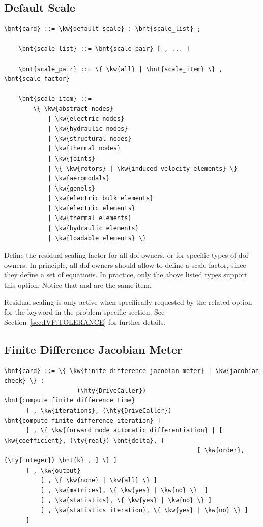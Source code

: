 \subsection{Default Scale}\label{sec:CONTROLDATA:DEFAULTSCALE}
\begin{Verbatim}[commandchars=\\\{\}]
    \bnt{card} ::= \kw{default scale} : \bnt{scale_list} ;

    \bnt{scale_list} ::= \bnt{scale_pair} [ , ... ]

    \bnt{scale_pair} ::= \{ \kw{all} | \bnt{scale_item} \} , \bnt{scale_factor}

    \bnt{scale_item} ::=
        \{ \kw{abstract nodes}
            | \kw{electric nodes}
            | \kw{hydraulic nodes}
            | \kw{structural nodes}
            | \kw{thermal nodes}
            | \kw{joints}
            | \{ \kw{rotors} | \kw{induced velocity elements} \}
            | \kw{aeromodals}
            | \kw{genels}
            | \kw{electric bulk elements}
            | \kw{electric elements}
            | \kw{thermal elements}
            | \kw{hydraulic elements}
            | \kw{loadable elements} \}
\end{Verbatim}
Define the residual scaling factor for all dof owners, or for specific
types of dof owners.
In principle, all dof owners should allow to define a scale factor,
since they define a set of equations.
In practice, only the above listed types support this option. Notice that
 and  are the same item.

Residual scaling is only active when specifically requested
by the related option for the  keyword
in the problem-specific section.
See Section~\ref{sec:IVP:TOLERANCE} for further details.

\subsection{Finite Difference Jacobian Meter}\label{sec:CONTROLDATA:FDJAC_METER}
\begin{Verbatim}[commandchars=\\\{\}]
  \bnt{card} ::= \{ \kw{finite difference jacobian meter} | \kw{jacobian check} \} :
                    (\hty{DriveCaller}) \bnt{compute_finite_difference_time}
      [ , \kw{iterations}, (\hty{DriveCaller}) \bnt{compute_finite_difference_iteration} ]
      [ , \{ \kw{forward mode automatic differentiation} | [ \kw{coefficient}, (\ty{real}) \bnt{delta}, ]
                                                     [ \kw{order}, (\ty{integer}) \bnt{k} , ] \} ]
      [ , \kw{output}
          [ , \{ \kw{none} | \kw{all} \} ]
          [ , \kw{matrices}, \{ \kw{yes} | \kw{no} \}  ]
          [ , \kw{statistics}, \{ \kw{yes} | \kw{no} \} ]
          [ , \kw{statistics iteration}, \{ \kw{yes} | \kw{no} \} ]
      ]
\end{Verbatim}

